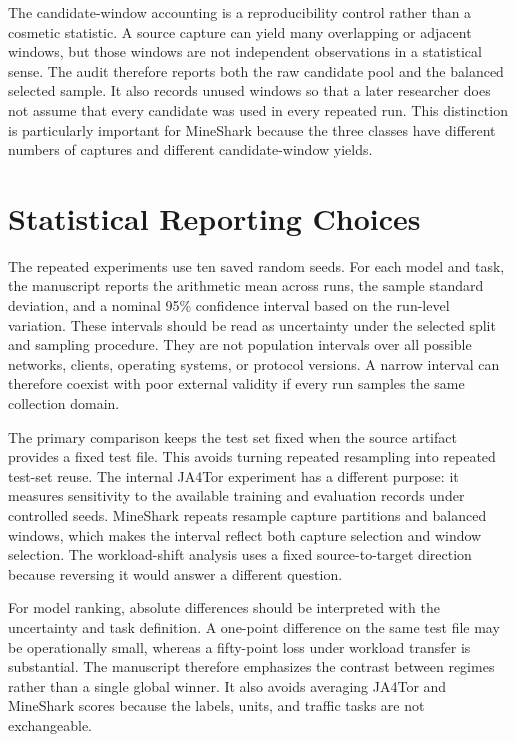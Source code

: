 \documentclass[conference]{IEEEtran}
\begin{document}
The candidate-window accounting is a reproducibility control rather than a cosmetic statistic. A source capture can yield many overlapping or adjacent windows, but those windows are not independent observations in a statistical sense. The audit therefore reports both the raw candidate pool and the balanced selected sample. It also records unused windows so that a later researcher does not assume that every candidate was used in every repeated run. This distinction is particularly important for MineShark because the three classes have different numbers of captures and different candidate-window yields.

\section{Statistical Reporting Choices}
The repeated experiments use ten saved random seeds. For each model and task, the manuscript reports the arithmetic mean across runs, the sample standard deviation, and a nominal 95\% confidence interval based on the run-level variation. These intervals should be read as uncertainty under the selected split and sampling procedure. They are not population intervals over all possible networks, clients, operating systems, or protocol versions. A narrow interval can therefore coexist with poor external validity if every run samples the same collection domain.

The primary comparison keeps the test set fixed when the source artifact provides a fixed test file. This avoids turning repeated resampling into repeated test-set reuse. The internal JA4Tor experiment has a different purpose: it measures sensitivity to the available training and evaluation records under controlled seeds. MineShark repeats resample capture partitions and balanced windows, which makes the interval reflect both capture selection and window selection. The workload-shift analysis uses a fixed source-to-target direction because reversing it would answer a different question.

For model ranking, absolute differences should be interpreted with the uncertainty and task definition. A one-point difference on the same test file may be operationally small, whereas a fifty-point loss under workload transfer is substantial. The manuscript therefore emphasizes the contrast between regimes rather than a single global winner. It also avoids averaging JA4Tor and MineShark scores because the labels, units, and traffic tasks are not exchangeable.
\end{document}
